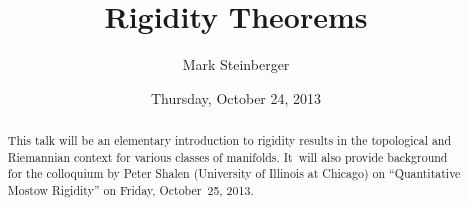 \documentclass{UAmathtalk}
\author{Mark Steinberger}
\title{Rigidity Theorems}
\date{Thursday, October 24, 2013}
\begin{document}
\maketitle

\begin{abstract}
This talk will be an elementary introduction to rigidity results in the topological and Riemannian context for various classes of manifolds.
It~will also provide background for the colloquium by Peter Shalen (University of Illinois at Chicago) on ``Quantitative Mostow Rigidity'' on Friday, October~25, 2013.
\end{abstract}
\end{document}
